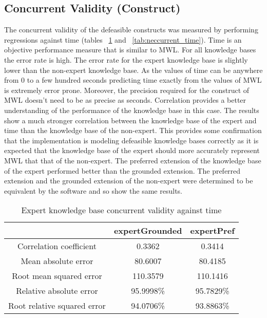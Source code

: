 \subsection{Concurrent Validity (Construct)}

The concurrent validity of the defeasible constructs was measured by performing regressions against time (tables ~\ref{tab:eccurrent_time} and ~\ref{tab:neccurrent_time}). Time is an objective performance measure that is similar to MWL. For all knowledge bases the error rate is high. The error rate for the expert knowledge base is slightly lower than the non-expert knowledge base. As the values of time can be anywhere from 0 to a few hundred seconds predicting time exactly from the values of MWL is extremely error prone. Moreover, the precision required for the construct of MWL doesn't need to be as precise as seconds. Correlation provides a better understanding of the performance of the knowledge base in this case. The results show a much stronger correlation between the knowledge base of the expert and time than the knowledge base of the non-expert. This provides some confirmation that the implementation is modeling defeasible knowledge bases correctly as it is expected that the knowledge base of the expert should more accurately represent MWL that that of the non-expert. The preferred extension of the knowledge base of the expert performed better than the grounded extension. The preferred extension and the grounded extension of the non-expert were determined to be equivalent by the software and so show the same results.

\begin{table}[!htbp]
\centering
\begin{tabular}{|c|c|c|}
\hline
                            &  expertGrounded & expertPref \\ \hline
Correlation coefficient     & 0.3362        & 0.3414      \\
Mean absolute error         & 80.6007       & 80.4185     \\
Root mean squared error     & 110.3579      & 110.1416  \\
Relative absolute error     & 95.9998\%     & 95.7829\% \\
Root relative squared error & 94.0706\%     & 93.8863\% \\
\hline
\end{tabular}
\caption{Expert knowledge base concurrent validity against time}
\label{tab:eccurrent_time}
\end{table}

